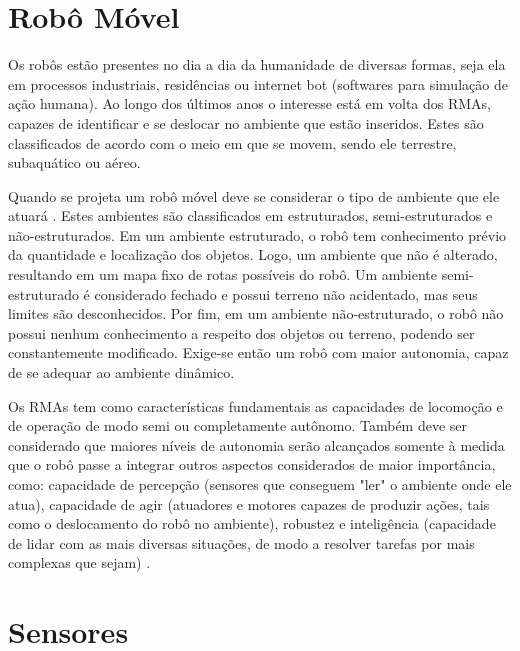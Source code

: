 
\section{Robô Móvel}
\label{sec:robomovel}

Os robôs estão presentes no dia a dia da humanidade de diversas formas, seja ela em processos industriais, residências ou internet bot (softwares para simulação de ação humana). Ao longo dos últimos anos o interesse está em volta dos RMAs, capazes de identificar e se deslocar no ambiente que estão inseridos. Estes são classificados de acordo com o meio em que se movem, sendo ele terrestre, subaquático ou aéreo.

Quando se projeta um robô móvel deve se considerar o tipo de ambiente que ele atuará \cite{rogeralex1999}. Estes ambientes são classificados em estruturados, semi-estruturados e não-estruturados. Em um ambiente estruturado, o robô tem conhecimento prévio da quantidade e localização dos objetos. Logo, um ambiente que não é alterado, resultando em um mapa fixo de rotas possíveis do robô. Um ambiente semi-estruturado é considerado fechado e possui terreno não acidentado, mas seus limites são desconhecidos. Por fim, em um ambiente não-estruturado, o robô não possui nenhum conhecimento a respeito dos objetos ou terreno, podendo ser constantemente modificado. Exige-se então um robô com maior autonomia, capaz de se adequar ao ambiente dinâmico.

Os RMAs tem como características fundamentais as capacidades de locomoção e de operação de modo semi ou completamente autônomo. Também deve ser considerado que maiores níveis de autonomia serão alcançados somente à medida que o robô passe a integrar outros aspectos considerados de maior importância, como: capacidade de percepção (sensores que conseguem "ler" o ambiente onde ele atua), capacidade de agir (atuadores e motores capazes de produzir ações, tais como o deslocamento do robô no ambiente), robustez e inteligência (capacidade de lidar com as mais diversas situações, de modo a resolver tarefas por mais complexas que sejam) \cite{wolf2009robotica}.

\section{Sensores}
\label{sec:sensores}

